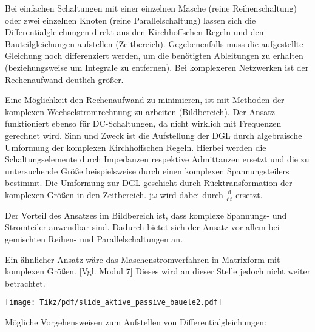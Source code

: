 \begin{frame}
{    %
    Bei einfachen Schaltungen mit einer einzelnen Masche (reine Reihenschaltung) oder zwei einzelnen Knoten (reine Parallelschaltung)
    lassen sich die Differentialgleichungen direkt aus den Kirchhoffschen Regeln und den Bauteilgleichungen aufstellen (Zeitbereich).
    Gegebenenfalls muss die aufgestellte Gleichung noch differenziert werden, um die benötigten Ableitungen zu erhalten
    (beziehungsweise um Integrale zu entfernen). 
    Bei komplexeren Netzwerken ist der Rechenaufwand deutlich größer. 

    Eine Möglichkeit den Rechenaufwand zu minimieren, ist mit Methoden der komplexen Wechselstromrechnung zu arbeiten (Bildbereich). 
    Der Ansatz funktioniert ebenso für DC-Schaltungen, da nicht wirklich mit Frequenzen gerechnet wird. 
    Sinn und Zweck ist die Aufstellung der DGL durch algebraische Umformung der komplexen Kirchhoffschen Regeln.
    Hierbei werden die Schaltungselemente durch Impedanzen respektive Admittanzen ersetzt und die zu untersuchende Größe
    beispielsweise durch einen komplexen Spannungsteilers bestimmt. 
    Die Umformung zur DGL geschieht durch Rücktransformation der komplexen Größen in den Zeitbereich.
    $\mathrm{j}\omega$ wird dabei durch $\frac{\mathrm{d}}{\mathrm{d} t}$ ersetzt. 
    
    Der Vorteil des Ansatzes im Bildbereich ist, dass komplexe Spannungs- und Stromteiler anwendbar sind. 
    Dadurch bietet sich der Ansatz vor allem bei gemischten Reihen- und Parallelschaltungen an.  

    Ein ähnlicher Ansatz wäre das Maschenstromverfahren in Matrixform mit komplexen Größen. [Vgl. Modul 7] 
    Dieses wird an dieser Stelle jedoch nicht weiter betrachtet.

}%
\b{%
    \texttt{[image: Tikz/pdf/slide\_aktive\_passive\_bauele2.pdf]}
}%
\end{frame}

\begin{frame}\ftx{\subsecname}%
\b{%
    Mögliche Vorgehensweisen zum Aufstellen von Differentialgleichungen:\\[5pt]
}
\end{frame}

